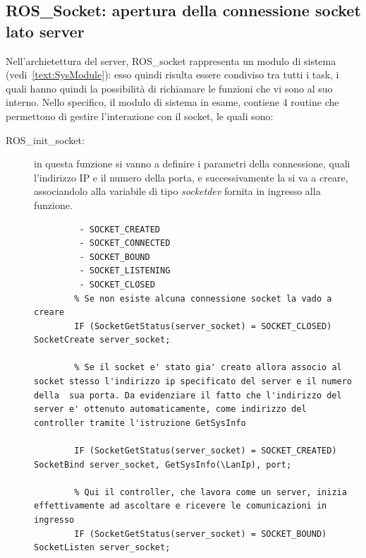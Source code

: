 \subsection{ROS\_Socket: apertura della connessione socket lato server}
Nell'archietettura del server, ROS\_socket rappresenta un modulo di sistema (vedi~\vref{text:SysModule}): esso quindi risulta essere condiviso tra tutti i task, i quali hanno quindi la possibilità di richiamare le funzioni che vi sono al suo interno. 
Nello specifico, il modulo di sistema in esame, contiene 4 routine che permettono di gestire l'interazione con il socket, le quali sono:
\begin{description}
	\item[ROS\_init\_socket:] in questa funzione si vanno a definire i parametri della connessione, quali l'indirizzo IP e il numero della porta, e successivamente la si va a creare, associandolo alla variabile di tipo \emph{socketdev} fornita in ingresso alla funzione.
	\begin{lstlisting}[style=Matlab-editor,caption=Analisi funzionamento routine ROS-init-socket ,captionpos=b,label={Code:ROSinitsocket}, basicstyle=\scriptsize\ttfamily,frame=trBL]
		% SocketGetStatus e' un istruzione che restituisce lo stato corrente di un socket, il quale puo' essere:
		 - SOCKET_CREATED
		 - SOCKET_CONNECTED
		 - SOCKET_BOUND
		 - SOCKET_LISTENING
		 - SOCKET_CLOSED
		% Se non esiste alcuna connessione socket la vado a creare 
		IF (SocketGetStatus(server_socket) = SOCKET_CLOSED) SocketCreate server_socket;
		
		% Se il socket e' stato gia' creato allora associo al socket stesso l'indirizzo ip specificato del server e il numero della  sua porta. Da evidenziare il fatto che l'indirizzo del server e' ottenuto automaticamente, come indirizzo del controller tramite l'istruzione GetSysInfo
		
		IF (SocketGetStatus(server_socket) = SOCKET_CREATED) SocketBind server_socket, GetSysInfo(\LanIp), port;
		
		% Qui il controller, che lavora come un server, inizia effettivamente ad ascoltare e ricevere le comunicazioni in ingresso
		IF (SocketGetStatus(server_socket) = SOCKET_BOUND) SocketListen server_socket;
	\end{lstlisting}
\end{description}
